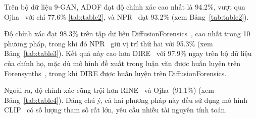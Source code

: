 Trên bộ dữ liệu 9-GAN, ADOF đạt độ chính xác cao nhất là 94.2\%, vượt qua Ojha~\cite{Ojha2023TowardsUF} với chỉ 77.6\% \ref{tab:table2}, và NPR~\cite{Tan2023RethinkingTU} đạt 93.2\% (xem Bảng~\ref{tab:table2}).

Độ chính xác đạt 98.3\% trên tập dữ liệu DiffusionForensics~\cite{Wang2023DIREFD}, cao nhất trong 10 phương pháp, trong khi đó NPR~\cite{Tan2023RethinkingTU} giữ vị trí thứ hai với 95.3\% (xem Bảng~\ref{tab:table3}). Kết quả này cao hơn DIRE~\cite{Wang2023DIREFD} với 97.9\% ngay trên bộ dữ liệu của chính họ, mặc dù mô hình đề xuất trong luận văn được huấn luyện trên Forensynths~\cite{Krizhevsky2012ImageNetCW}, trong khi DIRE được huấn luyện trên DiffusionForensics.

Ngoài ra, độ chính xác cũng trội hơn RINE~\cite{koutlis2024leveraging} và Ojha~\cite{Ojha2023TowardsUF}(91.1\%) (xem Bảng~\ref{tab:table4}). Đáng chú ý, cả hai phương pháp này đều sử dụng mô hình CLIP~\cite{abs-2103-00020} có số lượng tham số rất lớn, yêu cầu nhiều tài nguyên tính toán.






